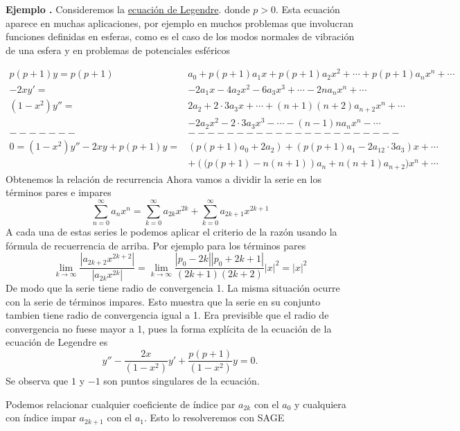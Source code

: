 \documentclass{article}
\newcounter{defi_cont}
\newcounter{lem_cont}
\newcounter{ejem_cont}
\newenvironment{ejemplo}[1]{\refstepcounter{ejem_cont}\vspace{1ex}\noindent\textbf{Ejemplo \arabic{ejem_cont}.} #1}{}
\begin{document}
\begin{ejemplo} Consideremos la \href{http://es.wikipedia.org/wiki/Polinomios_de_Legendre}{ecuación de Legendre}.
donde $p>0$. Esta ecuación aparece en muchas aplicaciones, por ejemplo en muchos problemas que involucran funciones definidas en esferas, como es el caso de los modos normales de vibración de una esfera y en problemas de potenciales esféricos

\[\begin{split}
   p(p+1)y= p(p+1)&a_0+ p(p+1)a_1x+ p(p+1)a_2x^2+\cdots+ p(p+1)a_nx^n+\cdots\\
  -2xy'=&-2a_1x-4a_2x^2-6a_3x^3+\cdots-2na_{n}x^n+\cdots\\
(1-x^2)y''=& 2a_2+2\cdot 3a_3x+\cdots +(n+1)(n+2)a_{n+2}x^n+\cdots\\
          &-2a_2x^2-2\cdot 3a_3x^3-\cdots -(n-1)na_{n}x^n-\cdots\\
     -------&----------------------\\
0=(1-x^2)y''-2xy+p(p+1)y =& (p(p+1)a_0+2a_2)+(p(p+1)a_1-2a_12\cdot 3a_3)x+\cdots\\
     &+ \left( (p(p+1)-n(n+1)\right)a_n+n(n+1)a_{n+2})x^n+\cdots
  \end{split}
\]
Obtenemos la relación de recurrencia
 Ahora vamos a dividir la serie en los términos pares e impares
\[\sum\limits_{n=0}^{\infty}a_nx^n= \sum\limits_{k=0}^{\infty}a_{2k}x^{2k}+\sum\limits_{k=0}^{\infty}a_{2k+1}x^{2k+1}\]
A cada una de estas series le podemos aplicar el criterio de la razón usando la fórmula de recuerrencia de arriba. Por ejemplo para los términos pares
\[\lim\limits_{k\to\infty}\frac{|a_{2k+2}x^{2k+2}|}{|a_{2k}x^{2k}|}=\lim\limits_{k\to\infty}\frac{|p_0-2k||p_0+2k+1|}{(2k+1)(2k+2)}|x|^2=|x|^2\]
De modo que la serie tiene radio de convergencia 1. La misma situación ocurre con la serie de términos impares. Esto muestra que la serie en su conjunto tambien tiene radio de convergencia igual a 1. Era previsible que el radio de convergencia no fuese mayor a 1, pues la forma explícita de la ecuación de la ecuación de Legendre es
\[y''-\frac{2x}{(1-x^2)}y'+\frac{p(p+1)}{(1-x^2)}y=0.\]
Se observa que $1$ y $-1$ son puntos singulares de la ecuación.

Podemos relacionar cualquier coeficiente de índice par $a_{2k}$ con el $a_0$ y cualquiera con índice impar $a_{2k+1}$ con el $a_1$. Esto lo resolveremos con SAGE


\end{ejemplo}
\end{document}

